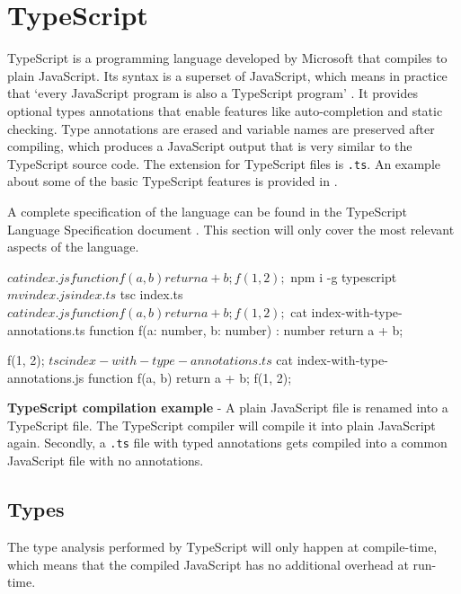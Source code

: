 \section{TypeScript} \label{sec:background-typescript}
TypeScript is a programming language developed by Microsoft that compiles to plain JavaScript. Its syntax is a superset of JavaScript, which means in practice that `every JavaScript program is also a TypeScript program' \citep{typescript}. It provides optional types annotations that enable features like auto-completion and static checking. Type annotations are erased and variable names are preserved after compiling, which produces a JavaScript output that is very similar to the TypeScript source code. The extension for TypeScript files is \texttt{.ts}. An example about some of the basic TypeScript features is provided in .

A complete specification of the language can be found in the TypeScript Language Specification document \citep{typescript}. This section will only cover the most relevant aspects of the language.

\begin{code}
	\begin{bashinline}
$ cat index.js 
function f(a, b) {
	return a + b;
}

f(1, 2);
$ npm i -g typescript
$ mv index.js index.ts
$ tsc index.ts
$ cat index.js
function f(a, b) {
    return a + b;
}
f(1, 2);
$ cat index-with-type-annotations.ts
function f(a: number, b: number) : number {
	return a + b;
}

f(1, 2);
$ tsc index-with-type-annotations.ts
$ cat index-with-type-annotations.js
function f(a, b) {
    return a + b;
}
f(1, 2);
	  \end{bashinline}
	\caption[TypeScript compilation example]{\textbf{TypeScript compilation example} - A plain JavaScript file is renamed into a TypeScript file. The TypeScript compiler will compile it into plain JavaScript again. Secondly, a \texttt{.ts} file with typed annotations gets compiled into a common JavaScript file with no annotations.}
	\label{code:background-typescript-and-javascript}
  \end{code}

\subsection{Types}
The type analysis performed by TypeScript will only happen at compile-time, which means that the compiled JavaScript has no additional overhead at run-time.

